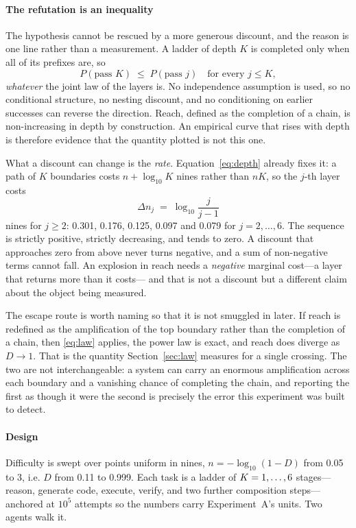 \documentclass[conference]{IEEEtran}
\theoremstyle{definition}
\begin{document}
\paragraph{The refutation is an inequality} The hypothesis cannot be rescued by a
more generous discount, and the reason is one line rather than a measurement. A
ladder of depth $K$ is completed only when all of its prefixes are, so
\begin{equation}
P\!\left(\text{pass }K\right)\;\le\;P\!\left(\text{pass }j\right)
\quad\text{for every } j\le K,
\label{eq:prefix}
\end{equation}
\emph{whatever} the joint law of the layers is. No independence assumption is used,
so no conditional structure, no nesting discount, and no conditioning on earlier
successes can reverse the direction. Reach, defined as the completion of a chain,
is non-increasing in depth by construction. An empirical curve that rises with
depth is therefore evidence that the quantity plotted is not this one.

What a discount can change is the \emph{rate}. Equation~\eqref{eq:depth} already
fixes it: a path of $K$ boundaries costs $n+\log_{10}K$ nines rather than $nK$, so
the $j$-th layer costs
\begin{equation}
\Delta n_j \;=\; \log_{10}\frac{j}{j-1}
\label{eq:marginal}
\end{equation}
nines for $j\ge2$: \num{0.301}, \num{0.176}, \num{0.125}, \num{0.097} and
\num{0.079} for $j=2,\dots,6$. The sequence is strictly positive, strictly
decreasing, and tends to zero. A discount that approaches zero from above never
turns negative, and a sum of non-negative terms cannot fall. An explosion in reach
needs a \emph{negative} marginal cost---a layer that returns more than it costs---
and that is not a discount but a different claim about the object being measured.

The escape route is worth naming so that it is not smuggled in later. If reach is
redefined as the amplification of the top boundary rather than the completion of a
chain, then \eqref{eq:law} applies, the power law is exact, and reach does diverge
as $D\to1$. That is the quantity Section~\ref{sec:law} measures for a single
crossing. The two are not interchangeable: a system can carry an enormous
amplification across each boundary and a vanishing chance of completing the chain,
and reporting the first as though it were the second is precisely the error this
experiment was built to detect.

\paragraph{Design} Difficulty is swept over \teGridPoints{} points uniform in
nines, $n=-\log_{10}(1-D)$ from \num{0.05} to \num{3}, i.e. $D$ from
\num{0.11} to \num{0.999}. Each task is a ladder of $K=1,\dots,6$
stages---reason, generate code, execute, verify, and two further composition
steps---anchored at $10^{5}$ attempts so the numbers carry Experiment~A's units.
Two agents walk it.
\end{document}

